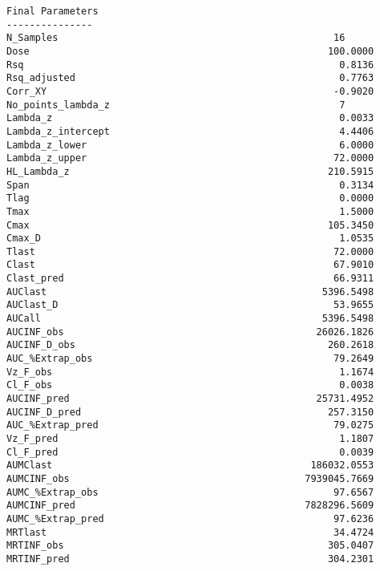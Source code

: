 \documentclass[12pt,a4paper]{article}
\begin{document}
\begin{verbatim}
Final Parameters
---------------
N_Samples                                                16
Dose                                                    100.0000
Rsq                                                       0.8136
Rsq_adjusted                                              0.7763
Corr_XY                                                  -0.9020
No_points_lambda_z                                        7
Lambda_z                                                  0.0033
Lambda_z_intercept                                        4.4406
Lambda_z_lower                                            6.0000
Lambda_z_upper                                           72.0000
HL_Lambda_z                                             210.5915
Span                                                      0.3134
Tlag                                                      0.0000
Tmax                                                      1.5000
Cmax                                                    105.3450
Cmax_D                                                    1.0535
Tlast                                                    72.0000
Clast                                                    67.9010
Clast_pred                                               66.9311
AUClast                                                5396.5498
AUClast_D                                                53.9655
AUCall                                                 5396.5498
AUCINF_obs                                            26026.1826
AUCINF_D_obs                                            260.2618
AUC_%Extrap_obs                                          79.2649
Vz_F_obs                                                  1.1674
Cl_F_obs                                                  0.0038
AUCINF_pred                                           25731.4952
AUCINF_D_pred                                           257.3150
AUC_%Extrap_pred                                         79.0275
Vz_F_pred                                                 1.1807
Cl_F_pred                                                 0.0039
AUMClast                                             186032.0553
AUMCINF_obs                                         7939045.7669
AUMC_%Extrap_obs                                         97.6567
AUMCINF_pred                                        7828296.5609
AUMC_%Extrap_pred                                        97.6236
MRTlast                                                  34.4724
MRTINF_obs                                              305.0407
MRTINF_pred                                             304.2301




\end{verbatim}
\end{document}
